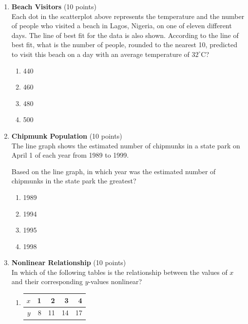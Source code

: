 \begin{enumerate}
  \newpage

  \item \textbf{Beach Visitors} (10 points)\\
  Each dot in the scatterplot above represents the temperature and the number of people who visited a beach in Lagos, Nigeria, on one of eleven different days. The line of best fit for the data is also shown. According to the line of best fit, what is the number of people, rounded to the nearest 10, predicted to visit this beach on a day with an average temperature of $32^{\circ} \mathrm{C}$?
  \begin{enumerate}[label=(\Alph*)]
    \item 440
    \item 460
    \item 480
    \item 500
  \end{enumerate}
  \begin{subanswer}
  \end{subanswer}


  \newpage

  \item \textbf{Chipmunk Population} (10 points)\\
  The line graph shows the estimated number of chipmunks in a state park on April 1 of each year from 1989 to 1999.


  Based on the line graph, in which year was the estimated number of chipmunks in the state park the greatest?
  \begin{enumerate}[label=(\Alph*)]
    \item 1989
    \item 1994
    \item 1995
    \item 1998
  \end{enumerate}
  \begin{subanswer}
  \end{subanswer}

  \item \textbf{Nonlinear Relationship} (10 points)\\
  In which of the following tables is the relationship between the values of $x$ and their corresponding $y$-values nonlinear?
  \begin{enumerate}[label=(\Alph*)]
    \item 
    \begin{center}
    \begin{tabular}{|r|r|r|r|r|}
    \hline
    $x$ & 1 & 2 & 3 & 4 \\
    \hline
    $y$ & 8 & 11 & 14 & 17 \\
    \hline
    \end{tabular}
    \end{center}


\end{enumerate}
\end{enumerate}
